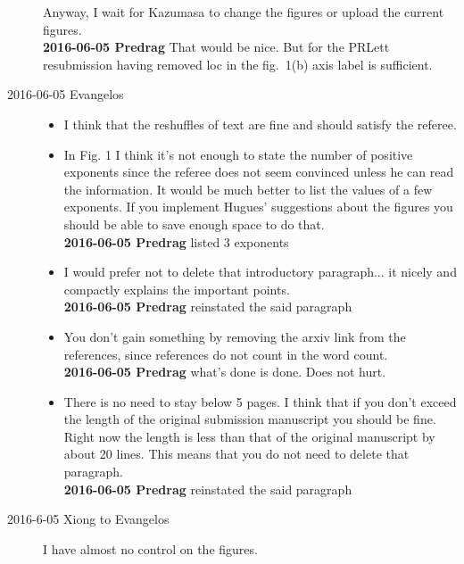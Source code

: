 \begin{description}
\begin{itemize}
\end{itemize}
Anyway, I wait for Kazumasa to change the figures or upload the
current figures.
  \\
  {\bf 2016-06-05 Predrag} That would be nice. But for the PRLett
  resubmission having removed loc in the fig.~1(b) axis label is
  sufficient.


\item [2016-06-05 Evangelos]
  \begin{itemize}
  \item I think that the reshuffles of text are fine and should satisfy the referee.

  \item In Fig. 1 I think it's not enough to state the number of positive
  exponents since the referee does not seem convinced unless he can read
  the information. It would be much better to list the values of a few
  exponents. If you implement Hugues' suggestions about the figures you
  should be able to save enough space to do that.
  \\
  {\bf 2016-06-05 Predrag} listed 3 exponents

  \item I would prefer not to delete that introductory paragraph... it
  nicely and compactly explains the important points.
  \\
  {\bf 2016-06-05 Predrag} reinstated the said paragraph

  \item You don't gain something by removing the arxiv link from the
  references, since references do not count in the word count.
    \\
  {\bf 2016-06-05 Predrag} what's done is done. Does not hurt.

  \item There is no need to stay below 5 pages. I think that if you
  don't exceed the length of the original submission manuscript you
  should be fine. Right now the length is less than that of the original
  manuscript by about 20 lines. This means that you do not need to delete
  that paragraph.
  \\
  {\bf 2016-06-05 Predrag} reinstated the said paragraph

  \end{itemize}


\item [2016-6-05 Xiong to Evangelos]
I have almost no control on the figures.


\end{description}
